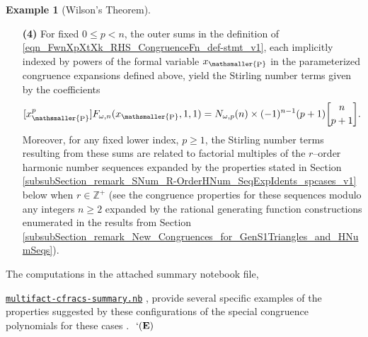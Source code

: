 \documentclass[12pt,reqno]{article}
\numberwithin{sfootnote}{section}
\numberwithin{equation}{section}
\theoremstyle{DefaultTheoremStyle}
\theoremstyle{definition}
\newtheorem{example}[theorem]{Example}
\newcommand{\eolqedsymbol}[1]{{\hrulefill\ensuremath{\ #1}}}
\renewcommand{\eolqedsymbol}[1]{{\mboxfill{ }\ensuremath{\ #1}}}
\newcommand{\ExampleQEDSymbol}{`(\text{\rm{\bf E}})}
\newcommand{\ExampleQED}{\eolqedsymbol{\ExampleQEDSymbol}}
\newcommand{\cf}[0]{cf.\ }
\newcommand{\TheSummaryNBFile}[0]{\texttt{multifact-cfracs-summary.nb}}
\newcommand{\TheSummaryNBFileGoogleDriveLink}[0]{https://drive.google.com/file/d/0B6na6iIT7ICZRFltbTVVcmVpVk0/view?usp=drivesdk}
\renewcommand{\TheSummaryNBFile}{ 
     \href{\TheSummaryNBFileGoogleDriveLink}{\texttt{multifact-cfracs-summary.nb}}%
}
\newcommand{\gkpSI}[2]{\ensuremath{\genfrac{\lbrack}{\rbrack}{0pt}{}{#1}{#2}}}
\DeclareMathOperator{\XP}{P}
\newcommand{\xp}{x_{\mathsmaller{\XP}}}
\begin{document}
\begin{example}[Wilson's Theorem]
\begin{itemize}
     \item[\bf (4)] 
     For fixed $0 \leq p < n$, the outer sums in the 
     definition of \eqref{eqn_FwnXpXtXk_RHS_CongruenceFn_def-stmt_v1}, 
     each implicitly indexed by powers of the 
     formal variable $\xp$ in the 
     parameterized congruence expansions defined above, 
     yield the Stirling number terms given by the coefficients 
     \[ 
     [\xp^{p}] F_{\omega,n}(\xp, 1, 1) = 
      N_{\omega,p}(n) \times (-1)^{n-1} (p+1) \gkpSI{n}{p+1}. 
     \] 
     Moreover, for any fixed lower index, $p \geq 1$, the 
     Stirling number terms resulting from these sums are 
     related to factorial multiples of the $r$--order harmonic number 
     sequences expanded by the properties stated in 
     Section \ref{subsubSection_remark_SNum_R-OrderHNum_SeqExpIdents_spcases_v1} below 
     when $r \in \mathbb{Z}^{+}$ \citep[\cf \S 4.3]{MULTIFACTJIS} 
     (see the congruence properties for these sequences 
     modulo any integers $n \geq 2$ expanded by the 
     rational generating function constructions enumerated in the results from 
     Section \ref{subsubSection_remark_New_Congruences_for_GenS1Triangles_and_HNumSeqs}). 
     \end{itemize} 
     The computations in the attached summary notebook file, 
     \TheSummaryNBFile, 
     provide several specific examples of the properties 
     suggested by these configurations of the 
     special congruence polynomials for these cases 
     \citep{SUMMARYNBREF-STUB}. 
\ExampleQED 
\end{example} 
\end{document}
